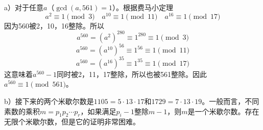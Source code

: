 %
\exercise a）对于任意$a$（$\gcd(a, 561)=1$）。根据费马小定理
\[a^2\equiv1\pmod3\quad a^{10}\equiv1\pmod{11}\quad a^{16}\equiv1\pmod{17}\]
因为560被2，10，16整除。所以
\[a^{560}=(a^2)^{280}\equiv 1^{280}\equiv1\pmod 3\]
\[a^{560}=(a^{10})^{56}\equiv 1^{56}\equiv1\pmod{11}\]
\[a^{560}=(a^{16})^{35}\equiv 1^{35}\equiv1\pmod{17}\]
这意味着$a^{560}-1$同时被2，11，17整除，所以也被561整除。因此$a^{560}\equiv 1\pmod{561}$。\par
b）接下来的两个米歇尔数是$1105=5\cdot13\cdot17$和$1729=7\cdot13\cdot19$。一般而言，不同素数的乘积$m=p_1p_2\cdots p_r$，如果满足$p_i-1$整除$m-1$，则$m$是一个米歇尔数。存在无限个米歇尔数，但是它的证明非常困难。